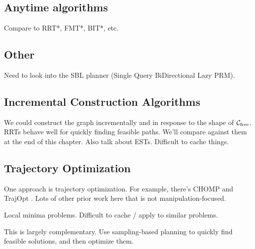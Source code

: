 \documentclass{report}
\begin{document}
%

\subsection{Anytime algorithms}

Compare to RRT*, FMT*, BIT*, etc.

\subsection{Other}

Need to look into the SBL planner \cite{sanchezante2001sbl}
(Single Query BiDirectional Lazy PRM).

\subsection{Incremental Construction Algorithms}

We could construct the graph incrementally and in response to the shape
of $\mathcal{C}_{\mbox{\scriptsize free}}$.
RRTs behave well for quickly finding feasible paths.
We'll compare against them at the end of this chapter.
Also talk about ESTs.
Difficult to cache things.

\subsection{Trajectory Optimization}

One approach is trajectory optimization.
For example, there's CHOMP \cite{zucker2013chomp}
and TrajOpt \cite{schulman2013trajopt}.
Lots of other prior work here that is not manipulation-focused.

Local minima problems.
Difficult to cache / apply to similar problems.

This is largely complementary.
Use sampling-based planning to quickly find feasible solutions,
and then optimize them.
\end{document}
